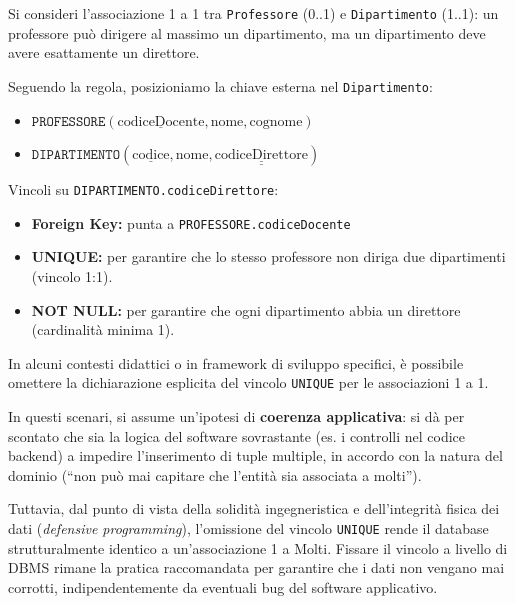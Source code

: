 \begin{example}
Si consideri l'associazione 1 a 1 tra \texttt{Professore} (0..1) e \texttt{Dipartimento} (1..1): un professore può dirigere al massimo un dipartimento, ma un dipartimento deve avere esattamente un direttore.

Seguendo la regola, posizioniamo la chiave esterna nel \texttt{Dipartimento}:
\begin{itemize}
    \item $\texttt{PROFESSORE}(\underline{\text{codiceDocente}}, \text{nome}, \text{cognome})$
    \item $\texttt{DIPARTIMENTO}(\underline{\text{codice}}, \text{nome}, \underline{\underline{\text{codiceDirettore}}})$
\end{itemize}

\medskip

Vincoli su \texttt{DIPARTIMENTO.codiceDirettore}:
\begin{itemize}
    \item \textbf{Foreign Key:} punta a \texttt{PROFESSORE.codiceDocente}
    \item \textbf{UNIQUE:} per garantire che lo stesso professore non diriga due dipartimenti (vincolo 1:1).
    \item \textbf{NOT NULL:} per garantire che ogni dipartimento abbia un direttore (cardinalità minima 1).
\end{itemize}
\end{example}

\begin{dettagli}
In alcuni contesti didattici o in framework di sviluppo specifici, è possibile omettere la dichiarazione esplicita del vincolo \texttt{UNIQUE} per le associazioni 1 a 1. 

In questi scenari, si assume un'ipotesi di \textbf{coerenza applicativa}: si dà per scontato che sia la logica del software sovrastante (es. i controlli nel codice backend) a impedire l'inserimento di tuple multiple, in accordo con la natura del dominio (``non può mai capitare che l'entità sia associata a molti'').

Tuttavia, dal punto di vista della solidità ingegneristica e dell'integrità fisica dei dati (\textit{defensive programming}), l'omissione del vincolo \texttt{UNIQUE} rende il database strutturalmente identico a un'associazione 1 a Molti. Fissare il vincolo a livello di DBMS rimane la pratica raccomandata per garantire che i dati non vengano mai corrotti, indipendentemente da eventuali bug del software applicativo.
\end{dettagli}

